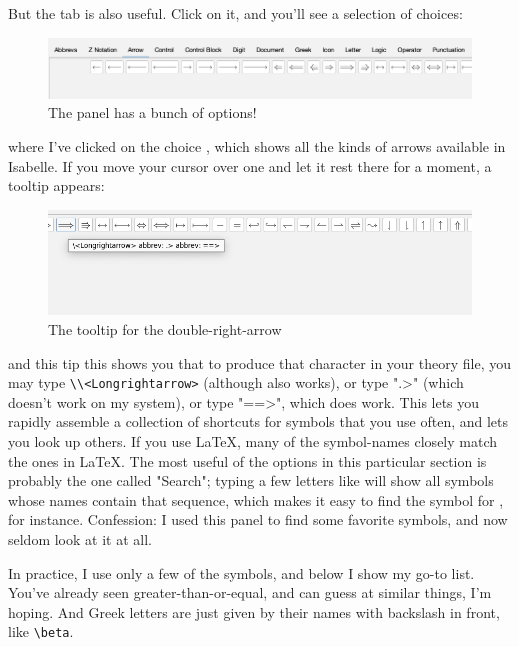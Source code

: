 But the  tab is also useful. Click on it, and you'll see a selection of choices:
\begin{figure} [h]
    \centering
    \includegraphics[width=0.75\linewidth]{TEXT//C02//Images/symbols.png}
    \caption{The  panel has a bunch of options!}
    \label{fig:symbols-panel}
\end{figure}
\noindent 
where I've clicked on the choice , which shows all the kinds of arrows available in Isabelle. If you move your cursor over one and let it rest there for a moment, a tooltip appears:
\begin{figure}
    \centering
    \includegraphics[width=0.5\linewidth]{TEXT//C02//Images/tooltip.png}
    \caption{The tooltip for the double-right-arrow}
    \label{fig:double-right}
\end{figure}
and this tip this shows you that to produce that character in your theory file, you may type \verb|\\<Longrightarrow>| (although \isi{\\Longrightarrow} also works), or type ".>" (which doesn't work on my system), or type "==>", which does work. This lets you rapidly assemble a collection of shortcuts for symbols that you use often, and lets you look up others. If you use LaTeX, many of the symbol-names closely match the ones in LaTeX. The most useful of the options in this particular section is probably the one called "Search"; typing a few letters like  will show all symbols whose names contain that sequence, which makes it easy to find the symbol for , for instance. Confession: I used this panel to find some favorite symbols, and now seldom look at it at all. 

In practice, I use only a few of the symbols, and below I show my go-to list. You've already seen greater-than-or-equal, and can guess at similar things, I'm hoping. And Greek letters are just given by their names with backslash in front, like \verb!\beta!.

